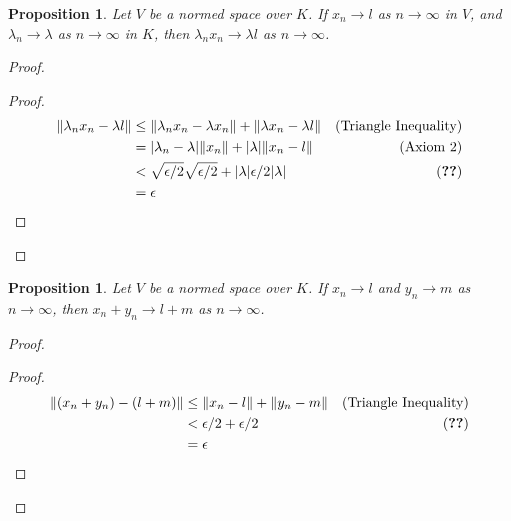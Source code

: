 \documentclass{book}
\let\qed\relax
\newtheorem{prop}[ax]{Proposition}
\theoremstyle{definition}
\begin{document}
\begin{prop}
Let $V$ be a normed space over $K$. If $x_n \rightarrow l$ as $n \rightarrow \infty$ in $V$, and $\lambda_n \rightarrow \lambda$ as $n \rightarrow \infty$ in $K$, then $\lambda_n x_n \rightarrow \lambda l$ as $n \rightarrow \infty$.
\end{prop}

\begin{proof}
\pf
{}
\begin{proof}
	\pf
	\begin{align*}
		\|\lambda_n x_n - \lambda l\| & \leq \| \lambda_n x_n - \lambda x_n \| + \| \lambda x_n - \lambda l \| & (\text{Triangle Inequality}) \\
		& = |\lambda_n - \lambda| \| x_n \| + |\lambda| \| x_n - l \|  & (\text{Axiom 2}) \\
		& < \sqrt{\epsilon/2} \sqrt{\epsilon/2} + |\lambda| \epsilon/2|\lambda| & (\text{\stepref{5}}) \\
		& = \epsilon
	\end{align*}
\end{proof}
\qed
\end{proof}

\begin{prop}
Let $V$ be a normed space over $K$. If $x_n \rightarrow l$ and $y_n \rightarrow m$ as $n \rightarrow \infty$, then $x_n + y_n \rightarrow l + m$ as $n \rightarrow \infty$.
\end{prop}

\begin{proof}
\pf
{}
\begin{proof}
	\pf
	\begin{align*}
		\|(x_n + y_n) - (l + m)\| & \leq \|x_n - l\| + \|y_n - m\| & (\text{Triangle Inequality}) \\
		& < \epsilon / 2 + \epsilon / 2 & (\text{\stepref{2}}) \\
		& = \epsilon
	\end{align*}
\end{proof}
\qed
\end{proof}
\end{document}
